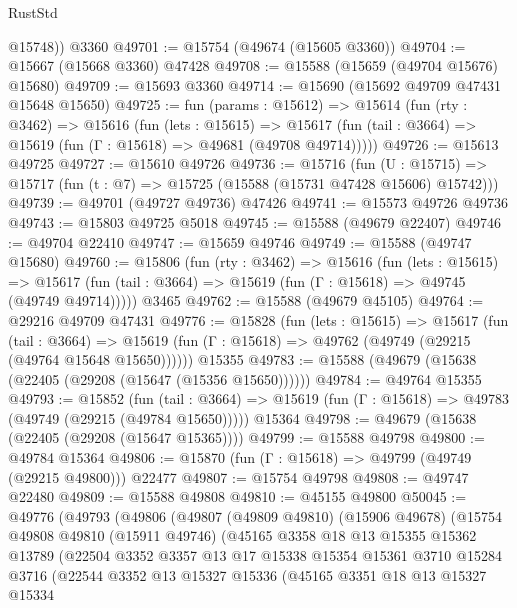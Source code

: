 \begin{lexlean}{RustStd}
\begin{coremodule}
        @15748))
    @3360
@49701 := @15754 (@49674 (@15605 @3360))
@49704 := @15667 (@15668 @3360) @47428
@49708 := @15588 (@15659 (@49704 @15676) @15680)
@49709 := @15693 @3360
@49714 := @15690 (@15692 @49709 @47431 @15648 @15650)
@49725 := fun (params : @15612) =>
  @15614
    (fun (rty : @3462) =>
    @15616
      (fun (lets : @15615) =>
      @15617 (fun (tail : @3664) => @15619 (fun (Γ : @15618) => @49681 (@49708 @49714)))))
@49726 := @15613 @49725
@49727 := @15610 @49726
@49736 := @15716
    (fun (U : @15715) => @15717 (fun (t : @7) => @15725 (@15588 (@15731 @47428 @15606) @15742)))
@49739 := @49701 (@49727 @49736) @47426
@49741 := @15573 @49726 @49736
@49743 := @15803 @49725 @5018
@49745 := @15588 (@49679 @22407)
@49746 := @49704 @22410
@49747 := @15659 @49746
@49749 := @15588 (@49747 @15680)
@49760 := @15806
    (fun (rty : @3462) =>
    @15616
      (fun (lets : @15615) =>
      @15617 (fun (tail : @3664) => @15619 (fun (Γ : @15618) => @49745 (@49749 @49714)))))
    @3465
@49762 := @15588 (@49679 @45105)
@49764 := @29216 @49709 @47431
@49776 := @15828
    (fun (lets : @15615) =>
    @15617
      (fun (tail : @3664) =>
      @15619 (fun (Γ : @15618) => @49762 (@49749 (@29215 (@49764 @15648 @15650))))))
    @15355
@49783 := @15588 (@49679 (@15638 (@22405 (@29208 (@15647 (@15356 @15650))))))
@49784 := @49764 @15355
@49793 := @15852
    (fun (tail : @3664) => @15619 (fun (Γ : @15618) => @49783 (@49749 (@29215 (@49784 @15650)))))
    @15364
@49798 := @49679 (@15638 (@22405 (@29208 (@15647 @15365))))
@49799 := @15588 @49798
@49800 := @49784 @15364
@49806 := @15870 (fun (Γ : @15618) => @49799 (@49749 (@29215 @49800))) @22477
@49807 := @15754 @49798
@49808 := @49747 @22480
@49809 := @15588 @49808
@49810 := @45155 @49800
@50045 := @49776
    (@49793
      (@49806
        (@49807
          (@49809 @49810)
          (@15906 @49678)
          (@15754
            @49808
            @49810
            (@15911 @49746)
            (@45165
              @3358
              @18
              @13
              @15355
              @15362
              @13789
              (@22504
                @3352
                @3357
                @13
                @17
                @15338
                @15354
                @15361
                @3710
                @15284
                @3716
                (@22544
                  @3352
                  @13
                  @15327
                  @15336
                  (@45165
                    @3351
                    @18
                    @13
                    @15327
                    @15334

\end{coremodule}
\end{lexlean}
